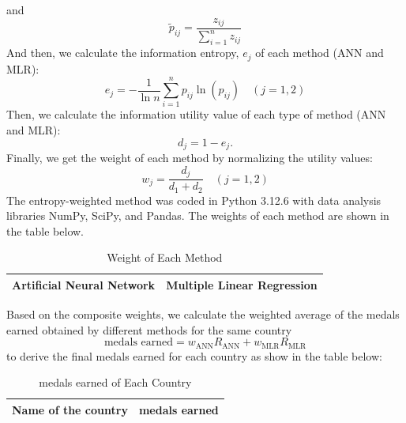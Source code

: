 \documentclass{mcmthesis}
\begin{document}
and
\begin{equation}\label{eq:1}
\tilde{p}_{ij}=\frac{z_{ij}}{\sum_{i=1}^n z_{ij}}
\end{equation}
And then, we calculate the information entropy, $e_j$ of each method (ANN and MLR):
\begin{equation}\label{eq:1}
e_j=-\frac{1}{\ln n}\sum_{i=1}^n p_{ij}\ln (p_{ij}) \quad \left( j=1,2 \right)  
\end{equation}
Then, we calculate the information utility value of each type of method (ANN and MLR):
\begin{equation}\label{eq:1}
d_j=1-e_j.  
\end{equation}
Finally, we get the weight of each method by normalizing the utility values:
\begin{equation}\label{eq:1}
w_j=\frac{d_j}{d_1+d_2} \quad (j=1,2)
\end{equation}
The entropy-weighted method was coded in Python 3.12.6 with data analysis libraries NumPy, SciPy, and Pandas. The weights of each method are shown in the table below.
\begin{table}[H]
\centering 
\label{B}
\caption{Weight of Each Method}
\vspace{5pt}
\begin{tabular}{l|c}
\hline
Artificial Neural Network & Multiple Linear Regression \\
\hline
\hline
\end{tabular}
\end{table}
Based on the composite weights, we calculate the weighted average of the medals earned obtained by different methods for the same country\\
\begin{equation}\label{eq:1}
\text{medals earned} = w_\text{ANN}R_\text{ANN} + w_\text{MLR}R_\text{MLR}
\end{equation}
to derive the final medals earned for each country as show in the table below:\\
\begin{table}[H]
\centering 
\label{c}
\caption{medals earned of Each Country}
\vspace{5pt}
\begin{tabular}{l|c}
\hline
Name of the country & medals earned \\
\hline
\hline
\end{tabular}
\end{table}
\end{document}
